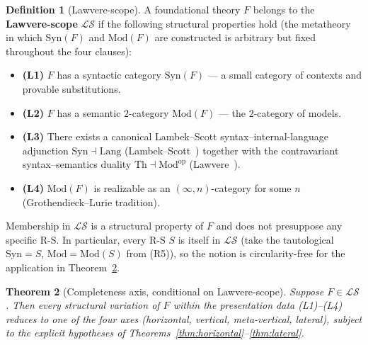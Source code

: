 \documentclass[11pt]{article}
\theoremstyle{plain}
\newtheorem{theorem}{Theorem}[section]
\theoremstyle{definition}
\newtheorem{definition}[theorem]{Definition}
\newcommand{\cS}{\mathcal{S}}
\newcommand{\cL}{\mathcal{L}}
\newcommand{\Syn}{\mathrm{Syn}}
\newcommand{\Mod}{\mathrm{Mod}}
\begin{document}
\begin{definition}[Lawvere-scope]\label{def:law-scope}
A foundational theory $F$ belongs to the \textbf{Lawvere-scope} $\cL\cS$ if the following structural properties hold (the metatheory in which $\Syn(F)$ and $\Mod(F)$ are constructed is arbitrary but fixed throughout the four clauses):
\begin{itemize}
\item \textbf{(L1)} $F$ has a syntactic category $\Syn(F)$ --- a small category of contexts and provable substitutions.
\item \textbf{(L2)} $F$ has a semantic $2$-category $\Mod(F)$ --- the $2$-category of models.
\item \textbf{(L3)} There exists a canonical Lambek--Scott syntax--internal-language adjunction $\Syn \dashv \mathrm{Lang}$ (Lambek--Scott~\cite{LambekScott1986}) together with the contravariant syntax--semantics duality $\mathrm{Th} \dashv \Mod^{\mathrm{op}}$ (Lawvere~\cite{Lawvere1969}).
\item \textbf{(L4)} $\Mod(F)$ is realizable as an $(\infty, n)$-category for some $n$ (Grothendieck--Lurie tradition).
\end{itemize}
Membership in $\cL\cS$ is a structural property of $F$ and does not presuppose any specific R-S. In particular, every R-S $S$ is itself in $\cL\cS$ (take the tautological $\Syn = S$, $\Mod = \Mod(S)$ from (R5)), so the notion is circularity-free for the application in Theorem~\ref{thm:completeness}.
\end{definition}

\begin{theorem}[Completeness axis, conditional on Lawvere-scope]\label{thm:completeness}
Suppose $F \in \cL\cS$. Then every structural variation of $F$ within the presentation data (L1)--(L4) reduces to one of the four axes (horizontal, vertical, meta-vertical, lateral), subject to the explicit hypotheses of Theorems~\ref{thm:horizontal}--\ref{thm:lateral}.
\end{theorem}
\end{document}
